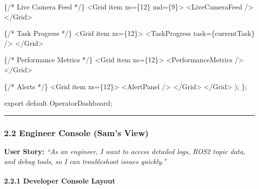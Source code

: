 \documentclass[
]{article}
\newenvironment{Shaded}{\begin{snugshade}}{\end{snugshade}}
\newcommand{\NormalTok}[1]{#1}
\begin{document}
\begin{Shaded}
\begin{Highlighting}[]
\NormalTok{      \{/* Live Camera Feed */\}}
\NormalTok{      \textless{}Grid item xs=\{12\} md=\{9\}\textgreater{}}
\NormalTok{        \textless{}LiveCameraFeed /\textgreater{}}
\NormalTok{      \textless{}/Grid\textgreater{}}

\NormalTok{      \{/* Task Progress */\}}
\NormalTok{      \textless{}Grid item xs=\{12\}\textgreater{}}
\NormalTok{        \textless{}TaskProgress task=\{currentTask\} /\textgreater{}}
\NormalTok{      \textless{}/Grid\textgreater{}}

\NormalTok{      \{/* Performance Metrics */\}}
\NormalTok{      \textless{}Grid item xs=\{12\}\textgreater{}}
\NormalTok{        \textless{}PerformanceMetrics /\textgreater{}}
\NormalTok{      \textless{}/Grid\textgreater{}}

\NormalTok{      \{/* Alerts */\}}
\NormalTok{      \textless{}Grid item xs=\{12\}\textgreater{}}
\NormalTok{        \textless{}AlertPanel /\textgreater{}}
\NormalTok{      \textless{}/Grid\textgreater{}}
\NormalTok{    \textless{}/Grid\textgreater{}}
\NormalTok{  );}
\NormalTok{\};}

\NormalTok{export default OperatorDashboard;}
\end{Highlighting}
\end{Shaded}

\begin{center}\rule{0.5\linewidth}{0.5pt}\end{center}

\hypertarget{engineer-console-sams-view}{%
\subsubsection{2.2 Engineer Console (Sam's
View)}\label{engineer-console-sams-view}}

\textbf{User Story:} \emph{``As an engineer, I want to access detailed
logs, ROS2 topic data, and debug tools, so I can troubleshoot issues
quickly.''}

\hypertarget{developer-console-layout}{%
\paragraph{2.2.1 Developer Console
Layout}\label{developer-console-layout}}
\end{document}
